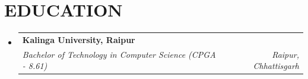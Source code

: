 \documentclass[letterpaper,11pt]{article}
\makeatletter
\newcommand{\resumeItem}[1]{
  \item\small{
    {#1 \vspace{-2pt}}
  }
}
\newcommand{\resumeSubheading}[4]{
  \vspace{-2pt}\item
    \begin{tabular*}{1.0\textwidth}[t]{l@{\extracolsep{\fill}}r}
      \textbf{#1} & \textbf{\small #2} \\
      \textit{\small#3} & \textit{\small #4} \\
    \end{tabular*}\vspace{-7pt}
}
\newcommand{\resumeSubHeadingListStart}{\begin{itemize}[leftmargin=0.0in, label={}]}
\newcommand{\resumeSubHeadingListEnd}{\end{itemize}}
\newcommand{\resumeItemListStart}{\begin{itemize}}
\newcommand{\resumeItemListEnd}{\end{itemize}\vspace{-5pt}}
\makeatother
\begin{document}
%
\section{EDUCATION}
  \resumeSubHeadingListStart
    \resumeSubheading
      {Kalinga University, Raipur}{}
      {Bachelor of Technology in Computer Science (CPGA - 8.61)}{Raipur, Chhattisgarh}
  \resumeSubHeadingListEnd
  \vspace{0pt}


        
\end{document}
